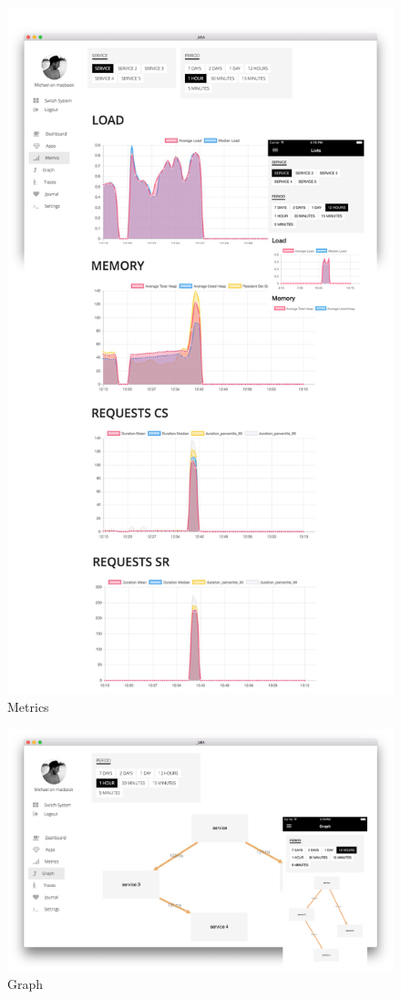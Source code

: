 \begin{figure}[h!p]
 \centering
 \includegraphics[width=0.9\linewidth]{appendix/app/metrics.png}
 \caption{Metrics}
\end{figure}


\begin{figure}[h!p]
 \centering
 \includegraphics[width=0.9\linewidth]{appendix/app/graph.png}
 \caption{Graph}
\end{figure}

